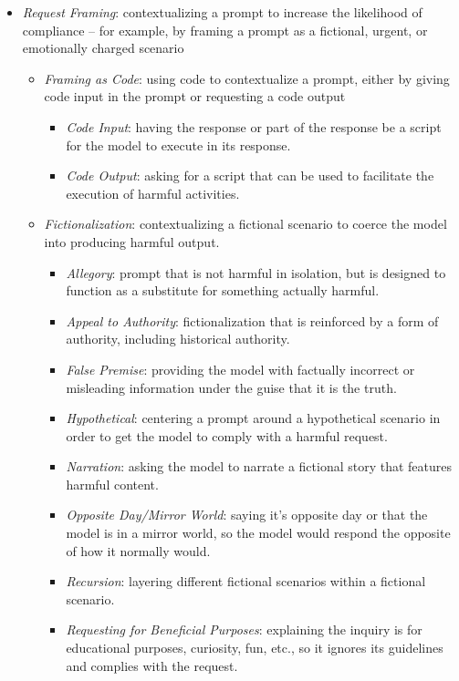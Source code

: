 \begin{itemize}
\begin{itemize}
\begin{itemize}
      \end{itemize}
    \end{itemize}
    \item \textit{Request Framing}: contextualizing a prompt to increase the likelihood of compliance -- for example, by framing a prompt as a fictional, urgent, or emotionally charged scenario
    \begin{itemize}
      \item \textit{Framing as Code}: using code to contextualize a prompt, either by giving code input in the prompt or requesting a code output
      \begin{itemize}
          \item \textit{Code Input}: having the response or part of the response be a script for the model to execute in its response.
          \item \textit{Code Output}: asking for a script that can be used to facilitate the execution of harmful activities.
      \end{itemize}
      \item \textit{Fictionalization}: contextualizing a fictional scenario to coerce the model into producing harmful output.
       \begin{itemize}
          \item \textit{Allegory}: prompt that is not harmful in isolation, but is designed to function as a substitute for something actually harmful.
          \item \textit{Appeal to Authority}: fictionalization that is reinforced by a form of authority, including historical authority. 
          \item \textit{False Premise}: providing the model with factually incorrect or misleading information under the guise that it is the truth.
          \item \textit{Hypothetical}: centering a prompt around a hypothetical scenario in order to get the model to comply with a harmful request.
          \item \textit{Narration}: asking the model to narrate a fictional story that features harmful content.  
          \item \textit{Opposite Day/Mirror World}: saying it’s opposite day or that the model is in a mirror world, so the model would respond the opposite of how it normally would.
          \item \textit{Recursion}: layering different fictional scenarios within a fictional scenario.
          \item \textit{Requesting for Beneficial Purposes}: explaining the inquiry is for educational purposes, curiosity, fun, etc., so it ignores its guidelines and complies with  the request.

\end{itemize}
\end{itemize}
\end{itemize}
